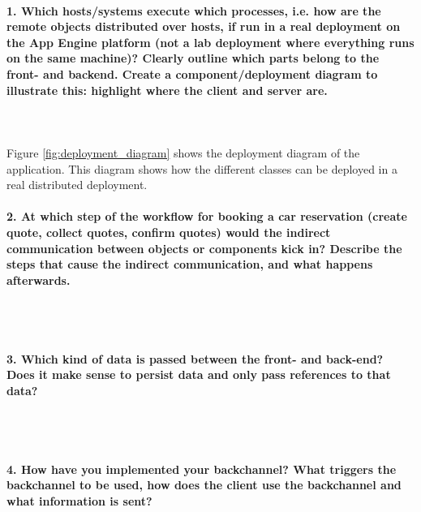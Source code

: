\documentclass{ds-report}
\begin{document}
	\maketitle

	\paragraph{1. Which hosts/systems execute which processes, i.e. how are the remote objects distributed over hosts, if run in a real deployment on the App Engine platform (not a lab deployment where everything runs on the same machine)? Clearly outline which parts belong to the front- and backend. Create a component/deployment diagram to illustrate this: highlight where the client and server are.} \mbox{}\\\\
Figure \ref{fig:deployment_diagram} shows the deployment diagram of the application. This diagram shows how the different classes can be deployed in a real distributed deployment.



	
	\paragraph{2. At which step of the workflow for booking a car reservation (create quote, collect quotes, confirm quotes) would the indirect communication between objects or components kick in? Describe the steps that cause the indirect communication, and what happens afterwards.} \mbox{}\\\\


	\paragraph{3. Which kind of data is passed between the front- and back-end? Does it make sense to persist data and only pass references to that data?} \mbox{}\\\\



	\paragraph{4. How have you implemented your backchannel? What triggers the backchannel to be used, how does the client use the backchannel and what information is sent?} \mbox{}\\\\
\end{document}
